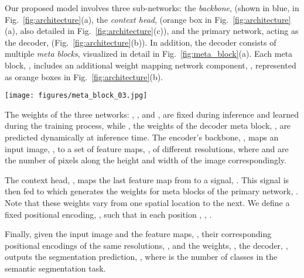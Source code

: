 \documentclass[final]{cvpr}
\newcommand{\minisection}[1]{\vspace{2mm}\noindent{\textbf{#1}.}}
\begin{document}
Our proposed model involves three sub-networks: the {\em backbone},  (shown in blue, in Fig.~\ref{fig:architecture}(a), the {\em context head},  (orange box in Fig.~\ref{fig:architecture}(a), also detailed in Fig.~\ref{fig:architecture}(c)), and the primary network, acting as the decoder,  (Fig.~\ref{fig:architecture}(b)). In addition, the decoder consists of multiple {\em meta blocks}, visualized in detail in Fig.~\ref{fig:meta_block}(a). Each meta block, , includes an additional weight mapping network component, , represented as orange boxes in Fig.~\ref{fig:architecture}(b). 

\begin{figure*}[t]
\centering
\texttt{[image: figures/meta\_block\_03.jpg]}\vspace{-2mm}
\caption{(a) \emph{The meta block based on the inverted residual block}~\cite{sandler2018mobilenetv2}. Each purple layer represents a dynamic patch-wise convolution with weights generated by the orange layer, . (b) \emph{Visualization of the dynamic patch-wise convolution operation.} Each color represents weights corresponding to a specific patch and '*' is the convolution operation. Please see Sec.~\ref{subsec:Dynamic patch-wise convolution} for more details.}
\vspace{-2mm}
\label{fig:meta_block}
\end{figure*}


\minisection{Information flow} The weights of the three networks: , , and , are fixed during inference and learned during the training process, while , the weights of the decoder meta block, , are predicted dynamically at inference time. 
The encoder's backbone, , maps an input image, , to a set of feature maps, 
, of different resolutions, where  and  are the number of pixels along the height and width of the image correspondingly. 



The context head, 
, maps the last feature map from  to a signal, . This signal is then fed to 
 which generates the weights for meta blocks of the primary network, . Note that these weights vary from one spatial location to the next. We define a fixed positional encoding, 
, such that in each position 
, , .



Finally, given the input image and the feature maps, , their corresponding positional encodings of the same resolutions, , and the weights, , the decoder, , outputs the segmentation prediction, , where  is the number of classes in the semantic segmentation task.
\end{document}
